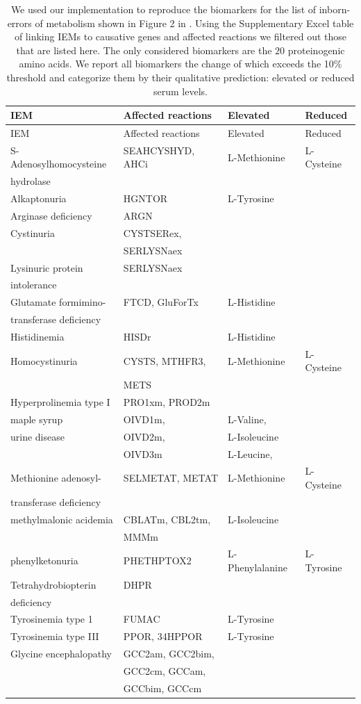 \documentclass[10pt,a4paper,onecolumn]{article}
\begin{document}
\hypertarget{tbl:amino_acid_iems}{}
\begin{longtable}[]{@{}llll@{}}
\caption{\label{tbl:amino_acid_iems}We used our implementation to
reproduce the biomarkers for the list of inborn-errors of metabolism
shown in Figure 2 in \autocite{Shlomi2009}. Using the Supplementary
Excel table of \autocite{Shlomi2009} linking IEMs to causative genes and
affected reactions we filtered out those that are listed here. The only
considered biomarkers are the \(20\) proteinogenic amino acids. We
report all biomarkers the change of which exceeds the 10\% threshold and
categorize them by their qualitative prediction: elevated or reduced
serum levels. }\tabularnewline
\toprule
IEM & Affected reactions & Elevated & Reduced\tabularnewline
\midrule
\endfirsthead
\toprule
IEM & Affected reactions & Elevated & Reduced\tabularnewline
\midrule
\endhead
S-Adenosylhomocysteine & SEAHCYSHYD, AHCi & L-Methionine &
L-Cysteine\tabularnewline
hydrolase & & &\tabularnewline
Alkaptonuria & HGNTOR & L-Tyrosine &\tabularnewline
Arginase deficiency & ARGN & &\tabularnewline
Cystinuria & CYSTSERex, & &\tabularnewline
& SERLYSNaex & &\tabularnewline
Lysinuric protein & SERLYSNaex & &\tabularnewline
intolerance & & &\tabularnewline
Glutamate formimino- & FTCD, GluForTx & L-Histidine &\tabularnewline
transferase deficiency & & &\tabularnewline
Histidinemia & HISDr & L-Histidine &\tabularnewline
Homocystinuria & CYSTS, MTHFR3, & L-Methionine &
L-Cysteine\tabularnewline
& METS & &\tabularnewline
Hyperprolinemia type I & PRO1xm, PROD2m & &\tabularnewline
maple syrup & OIVD1m, & L-Valine, &\tabularnewline
urine disease & OIVD2m, & L-Isoleucine &\tabularnewline
& OIVD3m & L-Leucine, &\tabularnewline
Methionine adenosyl- & SELMETAT, METAT & L-Methionine &
L-Cysteine\tabularnewline
transferase deficiency & & &\tabularnewline
methylmalonic acidemia & CBLATm, CBL2tm, & L-Isoleucine &\tabularnewline
& MMMm & &\tabularnewline
phenylketonuria & PHETHPTOX2 & L-Phenylalanine &
L-Tyrosine\tabularnewline
Tetrahydrobiopterin & DHPR & &\tabularnewline
deficiency & & &\tabularnewline
Tyrosinemia type 1 & FUMAC & L-Tyrosine &\tabularnewline
Tyrosinemia type III & PPOR, 34HPPOR & L-Tyrosine &\tabularnewline
Glycine encephalopathy & GCC2am, GCC2bim, & &\tabularnewline
& GCC2cm, GCCam, & &\tabularnewline
& GCCbim, GCCcm & &\tabularnewline
\bottomrule
\end{longtable}

{\sffamily \small
  \printbibliography[title=References]
}
\end{document}

